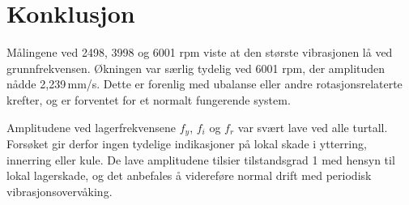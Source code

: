 \section{Konklusjon}
Målingene ved 2498, 3998 og 6001 rpm viste at den største vibrasjonen lå ved grunnfrekvensen. Økningen var særlig tydelig ved 6001 rpm, der amplituden nådde 2{,}239\,mm/s. Dette er forenlig med ubalanse eller andre rotasjonsrelaterte krefter, og er forventet for et normalt fungerende system.

Amplitudene ved lagerfrekvensene $f_y$, $f_i$ og $f_r$ var svært lave ved alle turtall. Forsøket gir derfor ingen tydelige indikasjoner på lokal skade i ytterring, innerring eller kule. De lave amplitudene tilsier tilstandsgrad 1 med hensyn til lokal lagerskade, og det anbefales å videreføre normal drift med periodisk vibrasjonsovervåking.
